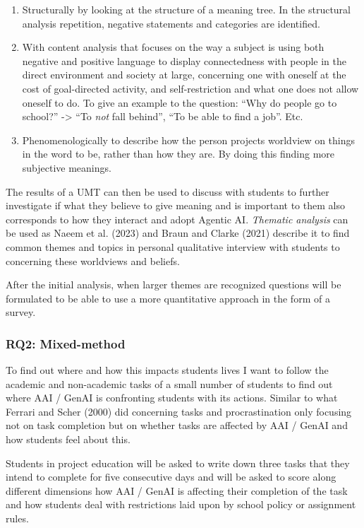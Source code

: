 \documentclass[
  letterpaper,
  DIV=11,
  numbers=noendperiod]{scrartcl}
\providecommand{\tightlist}{%
  \setlength{\itemsep}{0pt}\setlength{\parskip}{0pt}}
\begin{document}
\begin{enumerate}
\def\labelenumi{\arabic{enumi}.}
\tightlist
\item
  Structurally by looking at the structure of a meaning tree. In the
  structural analysis repetition, negative statements and categories are
  identified.
\item
  With content analysis that focuses on the way a subject is using both
  negative and positive language to display connectedness with people in
  the direct environment and society at large, concerning one with
  oneself at the cost of goal-directed activity, and self-restriction
  and what one does not allow oneself to do. To give an example to the
  question: ``Why do people go to school?'' -\textgreater{} ``To
  \emph{not} fall behind'', ``To be able to find a job''. Etc.
\item
  Phenomenologically to describe how the person projects worldview on
  things in the word to be, rather than how they are. By doing this
  finding more subjective meanings.
\end{enumerate}

The results of a UMT can then be used to discuss with students to
further investigate if what they believe to give meaning and is
important to them also corresponds to how they interact and adopt
Agentic AI. \emph{Thematic analysis} can be used as Naeem et al. (2023)
and Braun and Clarke (2021) describe it to find common themes and topics
in personal qualitative interview with students to concerning these
worldviews and beliefs.

After the initial analysis, when larger themes are recognized questions
will be formulated to be able to use a more quantitative approach in the
form of a survey.

\subsubsection{RQ2: Mixed-method}\label{rq2-mixed-method}

To find out where and how this impacts students lives I want to follow
the academic and non-academic tasks of a small number of students to
find out where AAI / GenAI is confronting students with its actions.
Similar to what Ferrari and Scher (2000) did concerning tasks and
procrastination only focusing not on task completion but on whether
tasks are affected by AAI / GenAI and how students feel about this.

Students in project education will be asked to write down three tasks
that they intend to complete for five consecutive days and will be asked
to score along different dimensions how AAI / GenAI is affecting their
completion of the task and how students deal with restrictions laid upon
by school policy or assignment rules.
\end{document}
